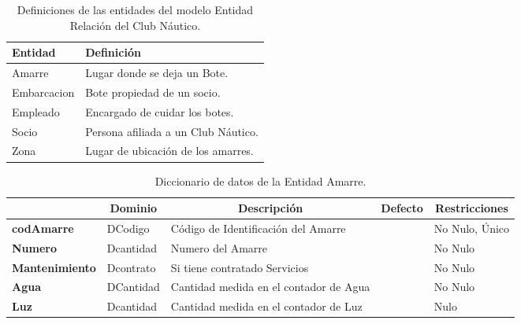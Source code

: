 \begin{table}[H]
\centering
\caption{Definiciones de las entidades del modelo Entidad Relación del Club Náutico.}
\renewcommand{\arraystretch}{1.5}%
\label{tab-Dicc-30}
\begin{tabular}{@{}ll@{}}
\toprule
\textbf{Entidad}  & \textbf{Definición}\\ \midrule
Amarre    & Lugar donde se deja un Bote. \\
Embarcacion  & Bote propiedad de un socio.\\
Empleado & Encargado de cuidar los botes.\\
Socio & Persona afiliada a un Club Náutico.\\
Zona & Lugar de ubicación de los amarres.\\
\bottomrule
\end{tabular}
\end{table}

\begin{table}[H]
\centering
\caption{Diccionario de datos de la Entidad Amarre.}
\label{tab-Dicc-31}
\begin{tabular}{>{\bfseries}m{4.0cm}>{}m{3.0cm}>{}m{6.0cm}>{}m{5.0cm}>{}m{2.0cm}}
\toprule
\multicolumn{1}{c}{\textbf{Atributo}} & \multicolumn{1}{c}{\textbf{Dominio}} & \multicolumn{1}{c}{\textbf{Descripción}} & \multicolumn{1}{c}{\textbf{Defecto}} & \multicolumn{1}{c}{\textbf{Restricciones}} \\ \midrule
codAmarre	&	DCodigo	&	Código de Identificación del Amarre	&		&	No Nulo, Único\\
Numero	&	Dcantidad	&	Numero del Amarre	&		&	No Nulo\\
Mantenimiento	&	Dcontrato	&	Si tiene contratado Servicios	&		&	No Nulo\\
Agua	&	DCantidad	&	Cantidad medida en el contador de Agua	&		&	No Nulo\\
Luz	&	Dcantidad	&	Cantidad medida en el contador de Luz	&		&	Nulo\\
\bottomrule
\end{tabular}
\end{table}


